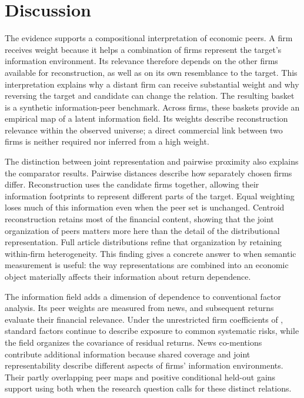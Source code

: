 \section{Discussion}\label{sec:limitations}

The evidence supports a compositional interpretation of economic peers.
A firm receives weight because it helps a combination of firms represent the
target's information environment.
Its relevance therefore depends on the other firms available for
reconstruction, as well as on its own resemblance to the target.
This interpretation explains why a distant firm can receive substantial
weight and why reversing the target and candidate can change the relation.
The resulting basket is a synthetic information-peer benchmark.
Across firms, these baskets provide an empirical map of a latent information
field.
Its weights describe reconstruction relevance within the observed universe;
a direct commercial link between two firms is neither required nor inferred
from a high weight.

The distinction between joint representation and pairwise proximity also
explains the comparator results.
Pairwise distances describe how separately chosen firms differ.
Reconstruction uses the candidate firms together, allowing their information
footprints to represent different parts of the target.
Equal weighting loses much of this information even when the peer set is
unchanged.
Centroid reconstruction retains most of the financial content, showing that
the joint organization of peers matters more here than the detail of the
distributional representation.
Full article distributions refine that organization by retaining within-firm
heterogeneity.
This finding gives a concrete answer to when semantic measurement is useful:
the way representations are combined into an economic object materially
affects their information about return dependence.

The information field adds a dimension of dependence to conventional factor
analysis.
Its peer weights are measured from news, and subsequent returns evaluate
their financial relevance.
Under the unrestricted firm coefficients of
, standard factors continue to describe
exposure to common systematic risks, while the field organizes the covariance
of residual returns.
News co-mentions contribute additional information because shared coverage
and joint representability describe different aspects of firms' information
environments.
Their partly overlapping peer maps and positive conditional held-out gains
support using both when the research question calls for these distinct
relations.

